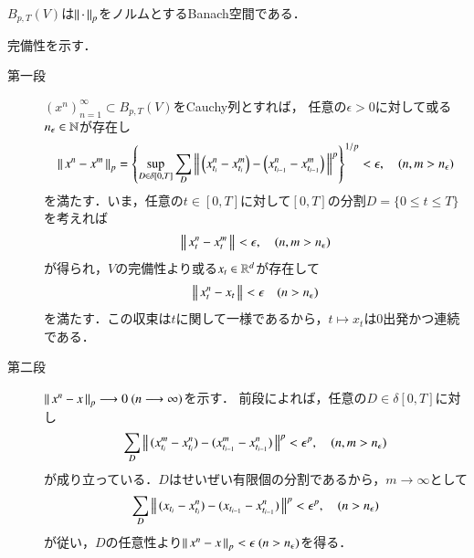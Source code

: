 \begin{screen}
	\begin{thm}\label{thm:B_p_T_Banach_space}
		$B_{p,T}(V)$は$\left\|\, \cdot\, \right\|_{p}$をノルムとするBanach空間である．
	\end{thm}
\end{screen}

\begin{prf}完備性を示す．
	\begin{description}
		\item[第一段] $(x^n)_{n=1}^{\infty} \subset B_{p,T}(V)$をCauchy列とすれば，
			任意の$\epsilon > 0$に対して或る$n_\epsilon \in \mathbb{N}$が存在し
			\begin{align}
				\left\|\, x^n - x^m\, \right\|_{p}
				= \left\{ \operatorname*{sup}_{D \in \delta[0,T]} \sum_{D} 
				\left\|\, \left( x^n_{t_i} - x^m_{t_i} \right) 
				- \left(x^n_{t_{i-1}} - x^m_{t_{i-1}} \right)\, \right\|_{}^p \right\}^{1/p} < \epsilon,
				\quad (n,m > n_\epsilon)
			\end{align}
			を満たす．いま，任意の$t \in [0,T]$に対して$[0,T]$の分割$D = \{0 \leq t \leq T\}$
			を考えれば
			\begin{align}
				\left\|\, x^n_t - x^m_t\, \right\|_{} < \epsilon,
				\quad (n,m > n_\epsilon)
			\end{align}
			が得られ，$V$の完備性より或る$x_t \in \mathbb{R}^d$が存在して
			\begin{align}
				\left\|\, x^n_t - x_t\, \right\|_{} < \epsilon
				\quad (n > n_\epsilon)
			\end{align}
			を満たす．この収束は$t$に関して一様であるから，$t \longmapsto x_t$は0出発かつ連続である．
			
		\item[第二段] $\left\|\, x^n - x\, \right\|_{p} \longrightarrow 0\ (n \longrightarrow \infty)$を示す．
			前段によれば，任意の$D \in \delta[0,T]$に対し
			\begin{align}
				\sum_D \left\|\, (x^m_{t_i} - x^n_{t_i}) - (x^m_{t_{i-1}} - x^n_{t_{i-1}})\, \right\|_{}^p
				< \epsilon^p,
				\quad (n,m > n_\epsilon)
			\end{align}
			が成り立っている．$D$はせいぜい有限個の分割であるから，$m \longrightarrow \infty$として
			\begin{align}
				\sum_D \left\|\, (x_{t_i} - x^n_{t_i}) - (x_{t_{i-1}} - x^n_{t_{i-1}})\, \right\|_{}^p
				< \epsilon^p,
				\quad (n > n_\epsilon)
			\end{align}
			が従い，$D$の任意性より$\left\|\, x^n - x\, \right\|_{p} < \epsilon\ (n > n_\epsilon)$を得る．
			\QED
	\end{description}
\end{prf}

